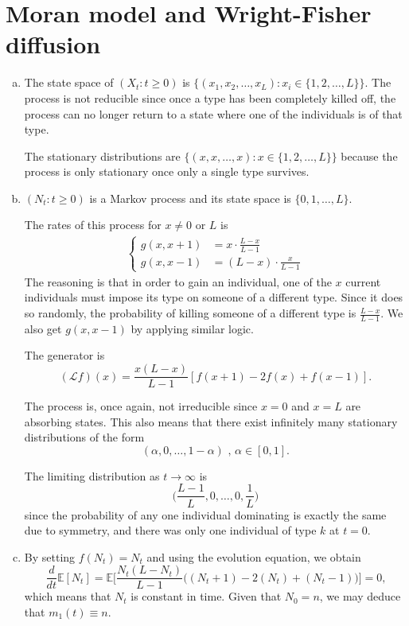 \documentclass[12pt, twoside, a4paper]{article}
\newcommand{\Gen}{\mathcal{L}}
\begin{document}
\section{Moran model and Wright-Fisher diffusion}
\begin{enumerate}[a)]
\item
The state space of $(X_t : t \geq 0)$ is $\{ (x_1, x_2, \dots, x_L) : x_i \in \{ 1, 2, \dots, L\}\}$. The process is not reducible since once a type has been completely killed off, the process can no longer return to a state where one of the individuals is of that type.

The stationary distributions are $\{(x, x, \dots, x) : x \in \{1, 2, \dots, L\}\}$ because the process is only stationary once only a single type survives. 

\item
$(N_t : t \geq 0)$ is a Markov process and its state space is $\{0, 1, \dots, L\}$. 

The rates of this process for $x \neq 0 \text{ or } L$ is 
\begin{align*}
\begin{cases}
g(x, x+1) &= x \cdot \frac{L-x}{L-1}\\
g(x, x-1) &= (L-x) \cdot \frac{x}{L-1}
\end{cases}
\end{align*}
The reasoning is that in order to gain an individual, one of the $x$ current individuals must impose its type on someone of a different type. Since it does so randomly, the probability of killing someone of a different type is $\frac{L-x}{L-1}$. We also get $g(x, x-1)$ by applying similar logic. 

The generator is 
\[
(\Gen f) (x) = \frac{x(L-x)}{L-1} [f(x+1) - 2f(x) + f(x-1)] \text{.}
\]

The process is, once again, not irreducible since $x = 0$ and $x = L$ are absorbing states. This also means that there exist infinitely many stationary distributions of the form 
\[
(\alpha, 0, \dots, 1- \alpha) \text{ , } \alpha \in [0, 1] \text{.}
\]

The limiting distribution as $t \to \infty$ is 
\[
\bigg( \frac{L-1}{L}, 0, \dots, 0, \frac{1}{L} \bigg)
\]
since the probability of any one individual dominating is exactly the same due to symmetry, and there was only one individual of type $k$ at $t = 0$. 

\item
By setting $f(N_t) = N_t$ and using the evolution equation, we obtain 
\[
\frac{d}{dt} \mathbb{E} [N_t] = \mathbb{E} \bigg[ \frac{N_t (L-N_t)}{L-1} \bigg( (N_t+1) - 2(N_t) + (N_t-1) \bigg) \bigg] = 0 \text{,}
\]
which means that $N_t$ is constant in time. Given that $N_0 = n$, we may deduce that $m_1(t) \equiv n$. 


\end{enumerate}
\end{document}
